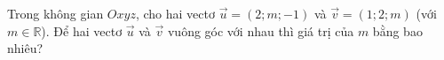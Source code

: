 \begin{ex}
Trong không gian $Oxyz$, cho hai vectơ $\vec u=(2;m;-1)$ và $\vec v=(1;2;m)$ (với $m\in\mathbb R$). Để hai vectơ $\vec u$ và $\vec v$ vuông góc với nhau thì giá trị của $m$ bằng bao nhiêu?
\end{ex}
